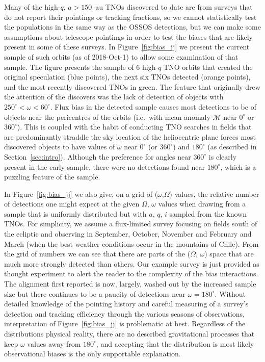 \documentclass[preprint]{aastex62}
\begin{document}
Many of the high-$q$, $a>150$~au TNOs discovered to date are from surveys that do not report their pointings or tracking fractions, so we cannot statistically test the populations in the same way as the OSSOS detections, but we can make some assumptions about telescope pointings in order to test the biases that are likely present in some of these surveys.
In Figure~\ref{fig:bias_jj} we present the current sample of such
orbits (as of 2018-Oct-1) to allow some examination of that sample.
The figure presents the sample of 6 high-$q$ TNO orbits that created the original
speculation (blue points), the next six TNOs detected (orange
points), and the most recently discovered TNOs in green.  The feature
that originally drew the attention of the discovers \citep{trujillosheppard14} was the lack of detection of
objects with $250^{\circ}< \omega < 60^{\circ}$.  Flux bias in the detected sample
causes most detections to be of objects near the pericentres of the
orbits (i.e.\ with mean anomaly $\mathcal{M}$ near $0^{\circ}$ or $360^{\circ}$).  This is coupled with the
habit of conducting TNO searches in fields that are predominantly
straddle the sky location of the heliocentric plane forces most
discovered objects to have values of $\omega$ near $0^{\circ}$ (or $360^{\circ}$) and $180^{\circ}$ (as described in Section~\ref{sec:intro}).
Although the preference for angles near $360^{\circ}$ is clearly present in the
early sample, there were no detections found near $180^{\circ}$, which is a puzzling feature of the sample.

In Figure~\ref{fig:bias_jj} we also give, on a grid of ($\omega$,$\Omega$) values, the relative
number of detections one might expect at the given $\Omega$,
$\omega$ values when drawing from a sample that is uniformly
distributed but with $a$, $q$, $i$ sampled from the known TNOs.
For simplicity, we assume a flux-limited survey focusing on fields south of the
ecliptic and observing in September, October, November and February
and March (when the best weather conditions occur in the mountains of Chile).  
From the grid of numbers we can see that there are parts
of the ($\Omega$, $\omega$) space that are much more strongly detected than others.  Our
example survey is just provided as thought experiment to alert the
reader to the complexity of the bias interactions. The alignment first
reported is now, largely, washed out by the increased sample size but
there continues to be a paucity of detections near $\omega = 180^{\circ}$.
Without detailed knowledge of the pointing history and careful
measuring of a survey's detection and tracking efficiency through the various seasons of observations,
interpretation of Figure~\ref{fig:bias_jj} is problematic at best.  Regardless of the
distributions physical reality, there are no described gravitational
processes that keep $\omega$ values away from $180^{\circ}$, and
accepting that the distribution is most likely observational biases is
the only supportable explanation.
\end{document}
